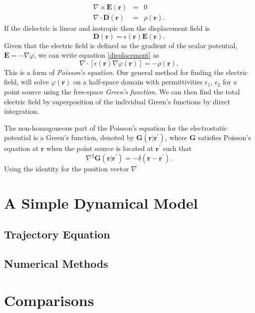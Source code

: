 \documentclass[a4paper, 12pt]{article}
\begin{document}
\begin{eqnarray}
\nabla \times \mathbf{E(r)}&=&0 \\
\nabla \cdot \mathbf{D(r)}&=&\rho(\mathbf{r}).
\end{eqnarray}
If the dielectric is linear and isotropic then the displacement field is 
\begin{equation}\label{displacement}
\mathbf{D(r)} = \epsilon(\mathbf{r})\mathbf{E}(\mathbf{r}).
\end{equation}
Given that the electric field is defined as the gradient of the scalar potential, $\mathbf{E}=-\nabla \varphi $, we can write equation \ref{displacement} as 
\begin{equation}
\nabla \cdot \left[\epsilon(\mathbf{r})\nabla \varphi (\mathbf{r}) \right] = -\rho (\mathbf{r}).
\end{equation}
This is a form of \emph{Poisson's equation}. Our general method for finding the electric field, will solve $\varphi (\mathbf{r})$ on a half-space domain with permittivities $\epsilon_1$, $\epsilon_2$ for a point source using the free-space \emph{Green's function}. We can then find the total electric field by superposition of the individual Green's functions by direct integration.

The non-homogoneous part of the Poisson's equation for the electrostatic potential is a Green's function, denoted by $\mathbf{G}(\mathbf{r} | \mathbf{r^\prime})$, where $\mathbf{G}$ satisfies Poisson's equation at $\mathbf{r}$ when the point source is located at $\mathbf{r^\prime}$ such that
\begin{equation}
\nabla^2 \mathbf{G}(\mathbf{r} | \mathbf{r^\prime}) = -\delta( \mathbf{r} - \mathbf{r^\prime}).
\end{equation}
Using the identity for the position vector $\nabla$

\section{A Simple Dynamical Model}
\subsection{Trajectory Equation}
\subsection{Numerical Methods}
\section{Comparisons}
\end{document}
